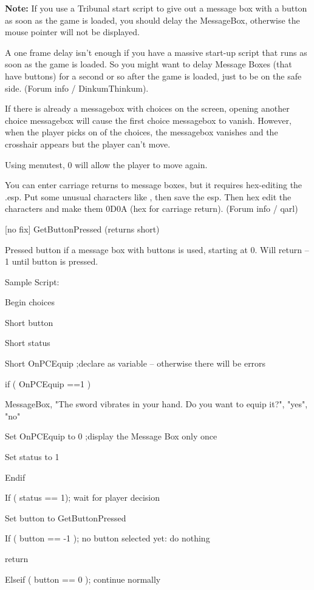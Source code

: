 \documentclass[
]{article}
\begin{document}
\textbf{Note:} If you use a Tribunal start script to give out a message
box with a button as soon as the game is loaded, you should delay the
MessageBox, otherwise the mouse pointer will not be displayed.

A one frame delay isn't enough if you have a massive start-up script
that runs as soon as the game is loaded. So you might want to delay
Message Boxes (that have buttons) for a second or so after the game is
loaded, just to be on the safe side. (Forum info / DinkumThinkum).

If there is already a messagebox with choices on the screen, opening
another choice messagebox will cause the first choice messagebox to
vanish. However, when the player picks on of the choices, the messagebox
vanishes and the crosshair appears but the player can't move.

Using menutest, 0 will allow the player to move again.

You can enter carriage returns to message boxes, but it requires
hex-editing the .esp. Put some unusual characters like \textbar\textbar,
then save the esp. Then hex edit the \textbar\textbar{} characters and
make them 0D0A (hex for carriage return). (Forum info / qarl)

{[}no fix{]} GetButtonPressed (returns short)

Pressed button if a message box with buttons is used, starting at 0.
Will return --1 until button is pressed.

Sample Script:

Begin choices

Short button

Short status

Short OnPCEquip ;declare as variable -- otherwise there will be errors

if ( OnPCEquip ==1 )

MessageBox, "The sword vibrates in your hand. Do you want to equip it?",
"yes", "no"

Set OnPCEquip to 0 ;display the Message Box only once

Set status to 1

Endif

If ( status == 1); wait for player decision

Set button to GetButtonPressed

If ( button == -1 ); no button selected yet: do nothing

return

Elseif ( button == 0 ); continue normally
\end{document}
